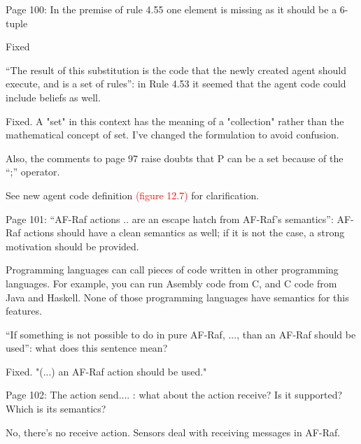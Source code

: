 \documentclass{article}
\newcommand*\R[1]{\textcolor{red}{#1}} %
\newenvironment{them}{\noindent\begingroup\color{blue}}{\endgroup\par}
\begin{document}
\begin{them}

Page 100:
In the premise of rule 4.55 one element is missing as it should be a 6-tuple
\end{them}
Fixed

\begin{them}

“The result of this substitution is the code that the newly created agent
should execute, and is a set of rules”: in Rule 4.53 it seemed that the agent
code could include beliefs as well.

\end{them}
Fixed. A "set" in this context has the meaning of a "collection" rather than
the mathematical concept of set. I've changed the formulation to avoid
confusion.

\begin{them}

Also, the comments to page 97 raise doubts that P can be a set because of the
“;” operator.

\end{them}
See new agent code definition \R{(figure 12.7)} for clarification.

\begin{them}

Page 101:
“AF-Raf actions .. are an escape hatch from AF-Raf's semantics”: AF-Raf actions
should have a clean semantics as well; if it is not the case, a strong
motivation should be provided.

\end{them}
Programming languages can call pieces of code written in other programming
languages. For example, you can run Asembly code from C, and C code from Java
and Haskell. None of those programming languages have semantics for this
features.

\begin{them}

“If something is not possible to do in pure AF-Raf, ..., than an AF-Raf should
be used”: what does this sentence mean?

\end{them}
Fixed. "(...) an AF-Raf action should be used."

\begin{them}

Page 102:
The action send.... : what about the action receive? Is it supported? Which is
its semantics?

\end{them}
No, there's no receive action. Sensors deal with receiving messages in AF-Raf.
\end{document}
